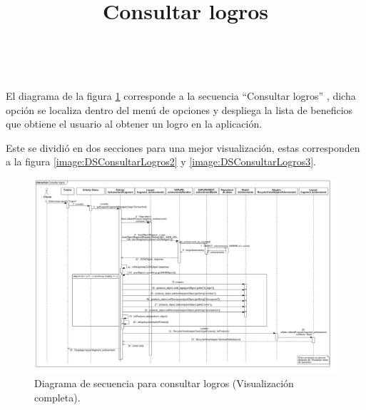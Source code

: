 \title{\textbf{Consultar logros}}
\\ \par
El diagrama de la figura \ref{image:DSConsultarLogros1} corresponde a la secuencia ``Consultar logros''
, dicha opción se localiza dentro del menú de opciones y despliega la lista de beneficios que obtiene el usuario al obtener un logro en la aplicación. \\ \par
Este se dividió en dos secciones para una mejor visualización, estas corresponden a la figura \ref{image:DSConsultarLogros2} y \ref{image:DSConsultarLogros3}. 
\FloatBarrier
\begin{figure}[htbp!]
		\centering
			\includegraphics[width=1.1 \textwidth]{imagenes/Diagramas_UserApp/Nuevos_diagramas/Logros}
		\caption{Diagrama de secuencia para consultar logros (Visualización completa).}
		\label{image:DSConsultarLogros1}
\end{figure}
\FloatBarrier

